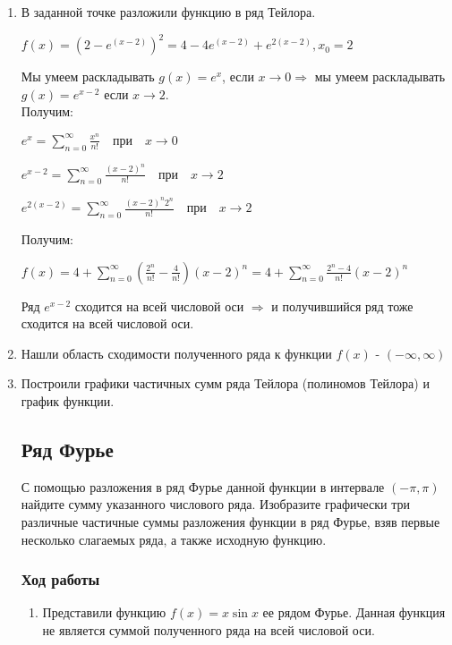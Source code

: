 \documentclass{article}
\begin{document}
\begin{enumerate}
    \item В заданной точке разложили  функцию в ряд Тейлора.
	
    $f(x) = (2 - e^{(x-2)})^2 = 4 - 4e^{(x-2)} + e^{2(x-2)}, x_0 = 2$

    Мы умеем раскладывать $g(x) = e^{x}$, если $x\to0 \Rightarrow$ мы умеем раскладывать $g(x) = e^{x-2}$ если $x \to 2$.\\

    Получим:

    $e^{x} =\sum_{n=0}^{\infty} \frac{x^n}{n!} \quad \text{при} \quad x \to 0$

    $e^{x-2} =        \sum_{n=0}^{\infty} \frac{(x-2)^n}{n!} \quad \text{при} \quad x \to 2$

    $e^{2(x-2)} =        \sum_{n=0}^{\infty} \frac{(x-2)^n2^{n}}{n!} \quad \text{при} \quad x \to 2$

    Получим:

    $f(x) = 4 + \sum_{n=0}^{\infty}(\frac{2^{n}}{n!} - \frac{4}{n!})(x-2)^{n} = 4 + \sum_{n=0}^{\infty}\frac{2^{n}-4}{n!}(x-2)^{n}$
    
    Ряд $e^{x-2}$ сходится на всей числовой оси $\Rightarrow$ и получившийся ряд тоже сходится на всей числовой оси.

    \item Нашли область сходимости полученного ряда к функции $f(x)$ - $(-\infty, \infty)$
    \item Построили графики частичных сумм ряда Тейлора (полиномов Тейлора) и график функции.

\subsection{Ряд Фурье}
С помощью разложения в ряд Фурье данной функции в интервале $(-\pi, \pi)$ найдите сумму указанного числового ряда. Изобразите графически три различные частичные суммы разложения функции в ряд Фурье, взяв первые несколько слагаемых ряда, а также исходную функцию.

\subsubsection*{Ход работы}

\begin{enumerate}
    \item Представили функцию $f(x) = x\sin{x}$ ее рядом Фурье. Данная функция не является суммой полученного ряда на всей числовой оси.


\end{enumerate}
\end{enumerate}
\end{document}
